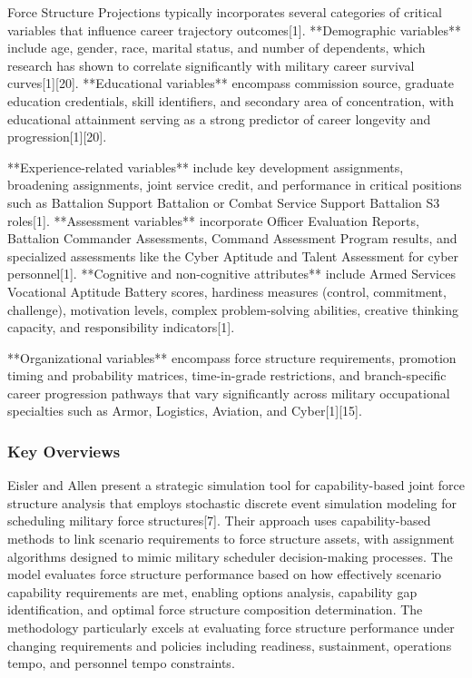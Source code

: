 \documentclass[main.tex]{subfiles}
\begin{document}
Force Structure Projections typically incorporates several categories of critical variables that influence career trajectory outcomes[1]. **Demographic variables** include age, gender, race, marital status, and number of dependents, which research has shown to correlate significantly with military career survival curves[1][20]. **Educational variables** encompass commission source, graduate education credentials, skill identifiers, and secondary area of concentration, with educational attainment serving as a strong predictor of career longevity and progression[1][20].

**Experience-related variables** include key development assignments, broadening assignments, joint service credit, and performance in critical positions such as Battalion Support Battalion or Combat Service Support Battalion S3 roles[1]. **Assessment variables** incorporate Officer Evaluation Reports, Battalion Commander Assessments, Command Assessment Program results, and specialized assessments like the Cyber Aptitude and Talent Assessment for cyber personnel[1]. **Cognitive and non-cognitive attributes** include Armed Services Vocational Aptitude Battery scores, hardiness measures (control, commitment, challenge), motivation levels, complex problem-solving abilities, creative thinking capacity, and responsibility indicators[1].

**Organizational variables** encompass force structure requirements, promotion timing and probability matrices, time-in-grade restrictions, and branch-specific career progression pathways that vary significantly across military occupational specialties such as Armor, Logistics, Aviation, and Cyber[1][15].

\subsubsection{Key Overviews}

Eisler and Allen present a strategic simulation tool for capability-based joint force structure analysis that employs stochastic discrete event simulation modeling for scheduling military force structures[7]. Their approach uses capability-based methods to link scenario requirements to force structure assets, with assignment algorithms designed to mimic military scheduler decision-making processes. The model evaluates force structure performance based on how effectively scenario capability requirements are met, enabling options analysis, capability gap identification, and optimal force structure composition determination. The methodology particularly excels at evaluating force structure performance under changing requirements and policies including readiness, sustainment, operations tempo, and personnel tempo constraints.
\end{document}
